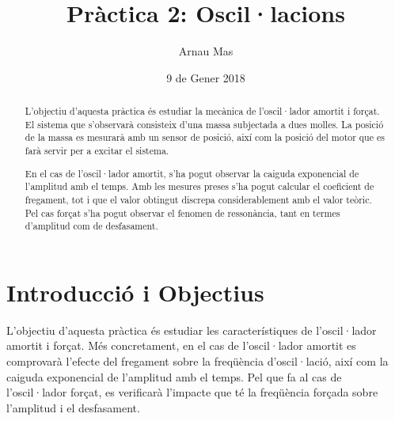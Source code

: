 \usepackage{header}

\usepackage[bf,sf]{titlesec}
\usepackage[font={footnotesize,sf}]{caption}

\usepackage{titling,abstract,fancyhdr}




\usepackage[colorlinks=false]{hyperref}
\usepackage[top=3cm, bottom=3cm, left=2.5cm, right=2.5cm]{geometry}
\usepackage{siunitx}

\title{\textsf{\textbf{Pràctica 2: Oscil·lacions}}}
\author{\textsf{Arnau Mas}}
\date{\textsf{9 de Gener 2018}}



\begin{titlingpage}
 \maketitle

\noindent 


\begin{abstract}
	L'objectiu d'aquesta pràctica és estudiar la mecànica de l'oscil·lador amortit i forçat. El sistema que s'observarà consisteix d'una massa subjectada a dues molles. La posició de la massa es mesurarà amb un sensor de posició, així com la posició del motor que es farà servir per a excitar el sistema.

	En el cas de l'oscil·lador amortit, s'ha pogut observar la caiguda exponencial de l'amplitud amb el temps. Amb les mesures preses s'ha pogut calcular el coeficient de fregament, tot i que el valor obtingut discrepa considerablement amb el valor teòric. Pel cas forçat s'ha pogut observar el fenomen de ressonància, tant en termes d'amplitud com de desfasament. 
\end{abstract}

\end{titlingpage}

\begin{titlingpage}
\tableofcontents
\end{titlingpage}

\section{Introducció i Objectius}\label{sec:intro}
L'objectiu d'aquesta pràctica és estudiar les característiques de l'oscil·lador amortit i forçat. Més concretament, en el cas de l'oscil·lador amortit es comprovarà l'efecte del fregament sobre la freqüència d'oscil·lació, així com la caiguda exponencial de l'amplitud amb el temps. Pel que fa al cas de l'oscil·lador forçat, es verificarà l'impacte que té la freqüència forçada sobre l'amplitud i el desfasament.

